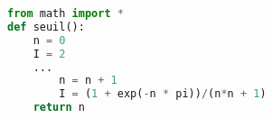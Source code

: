 \begin{lstlisting}[language=python]
from math import *
def seuil():
	n = 0
	I = 2
	...
		n = n + 1
		I = (1 + exp(-n * pi))/(n*n + 1)
	return n

\end{lstlisting}